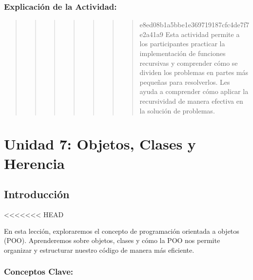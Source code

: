 \documentclass[
  a4paper,
  DIV=11,
  numbers=noendperiod,
  onepage,
  openany]{scrreprt}
\begin{document}
\hypertarget{explicaciuxf3n-de-la-actividad-45}{%
\section{Explicación de la
Actividad:}\label{explicaciuxf3n-de-la-actividad-45}}

\begin{quote}
\begin{quote}
\begin{quote}
\begin{quote}
\begin{quote}
\begin{quote}
\begin{quote}
e8ed08b1a5bbe1e369719187cfc4de7f7e2a41a9 Esta actividad permite a los
participantes practicar la implementación de funciones recursivas y
comprender cómo se dividen los problemas en partes más pequeñas para
resolverlos. Les ayuda a comprender cómo aplicar la recursividad de
manera efectiva en la solución de problemas.
\end{quote}
\end{quote}
\end{quote}
\end{quote}
\end{quote}
\end{quote}
\end{quote}

\part{Unidad 7: Objetos, Clases y Herencia}

\hypertarget{introducciuxf3n}{%
\chapter{Introducción}\label{introducciuxf3n}}

\textless\textless\textless\textless\textless\textless\textless{} HEAD

En esta lección, exploraremos el concepto de programación orientada a
objetos (POO). Aprenderemos sobre objetos, clases y cómo la POO nos
permite organizar y estructurar nuestro código de manera más eficiente.

\hypertarget{conceptos-clave-48}{%
\section{Conceptos Clave:}\label{conceptos-clave-48}}
\end{document}
